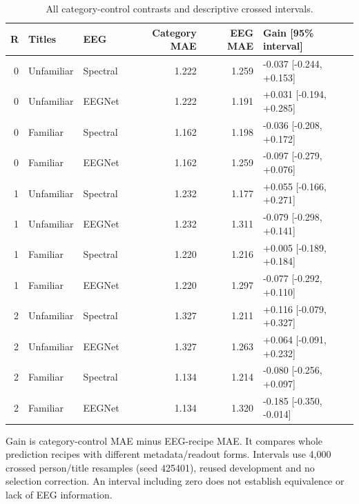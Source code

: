 \begin{table}[tbp]
\centering
\small
\caption{All category-control contrasts and descriptive crossed intervals.}
\label{tab:categorygains}
\begin{tabular}{rllrrl}
\toprule
R & Titles & EEG & Category MAE & EEG MAE & Gain [95\% interval] \\
\midrule
0 & Unfamiliar & Spectral & 1.222 & 1.259 & -0.037 [-0.244, +0.153] \\
0 & Unfamiliar & EEGNet & 1.222 & 1.191 & +0.031 [-0.194, +0.285] \\
0 & Familiar & Spectral & 1.162 & 1.198 & -0.036 [-0.208, +0.172] \\
0 & Familiar & EEGNet & 1.162 & 1.259 & -0.097 [-0.279, +0.076] \\
1 & Unfamiliar & Spectral & 1.232 & 1.177 & +0.055 [-0.166, +0.271] \\
1 & Unfamiliar & EEGNet & 1.232 & 1.311 & -0.079 [-0.298, +0.141] \\
1 & Familiar & Spectral & 1.220 & 1.216 & +0.005 [-0.189, +0.184] \\
1 & Familiar & EEGNet & 1.220 & 1.297 & -0.077 [-0.292, +0.110] \\
2 & Unfamiliar & Spectral & 1.327 & 1.211 & +0.116 [-0.079, +0.327] \\
2 & Unfamiliar & EEGNet & 1.327 & 1.263 & +0.064 [-0.091, +0.232] \\
2 & Familiar & Spectral & 1.134 & 1.214 & -0.080 [-0.256, +0.097] \\
2 & Familiar & EEGNet & 1.134 & 1.320 & -0.185 [-0.350, -0.014] \\
\bottomrule
\end{tabular}
\par\medskip\begin{minipage}{0.97\linewidth}\footnotesize Gain is category-control MAE minus EEG-recipe MAE. It compares whole prediction recipes with different metadata/readout forms. Intervals use 4,000 crossed person/title resamples (seed 425401), reused development and no selection correction. An interval including zero does not establish equivalence or lack of EEG information.\end{minipage}
\end{table}
